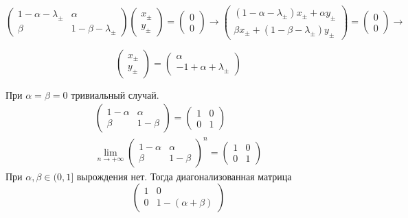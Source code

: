 \documentclass[a4paper,12pt]{article} %
\begin{document}
\begin{example}
$$
\left(\begin{array}{cc}
1-\alpha-\lambda_{\pm} & \alpha \\
\beta & 1-\beta-\lambda_{\pm}
\end{array}\right)\left(\begin{array}{l}
x_{\pm} \\
y_{\pm}
\end{array}\right)=\left(\begin{array}{l}
0 \\
0
\end{array}\right) \rightarrow\left(\begin{array}{l}
\left(1-\alpha-\lambda_{\pm}\right) x_{\pm}+\alpha y_{\pm} \\
\beta x_{\pm}+\left(1-\beta-\lambda_{\pm}\right) y_{\pm}
\end{array}\right)=\left(\begin{array}{l}
0 \\
0
\end{array}\right) \rightarrow
$$

$$
\left(\begin{array}{l}
x_{\pm} \\
y_{\pm}
\end{array}\right)=\left(\begin{array}{c}
\alpha \\
-1+\alpha+\lambda_{\pm}
\end{array}\right)
$$



При $\alpha=\beta=0$ тривиальный случай.
$$
\begin{array}{c}
\left(\begin{array}{cc}
	1-\alpha & \alpha \\
	\beta & 1-\beta
\end{array}\right)=\left(\begin{array}{cc}
	1 & 0 \\
	0 & 1
\end{array}\right) 
\\
\lim_{n \rightarrow+\infty}\left(\begin{array}{cc}
	1-\alpha & \alpha \\
	\beta & 1-\beta
\end{array}\right)^{n}
=
\left(
\begin{array}{cc}
	1 & 0 \\
	0 & 1
\end{array}\right)
\end{array}
$$
При $\alpha, \beta \in(0,1]$ вырождения нет. Тогда диагонализованная матрица
$$
\left(\begin{array}{cc}
1 & 0 \\
0 & 1-(\alpha+\beta)
\end{array}\right)
$$


\end{example}
\end{document}
